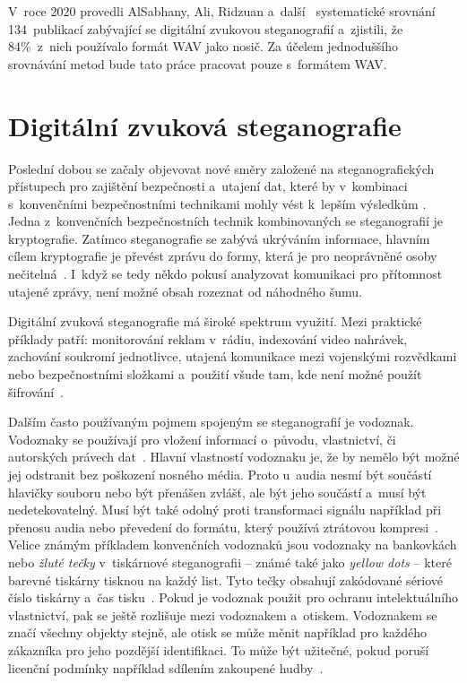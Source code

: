 V~roce 2020 provedli AlSabhany, Ali, Ridzuan a~další~\cite{AlSabhany2020}
systematické srovnání 134~publikací zabývající se digitální zvukovou
steganografií a~zjistili, že 84\%~z~nich používalo formát WAV jako nosič. Za
účelem jednoduššího srovnávání metod bude tato práce pracovat pouze s~formátem
WAV.

\section{Digitální zvuková steganografie}
\label{sec:digital-audio-steganography}

Poslední dobou se začaly objevovat nové směry založené na steganografických
přístupech pro zajištění bezpečnosti a~utajení dat, které by v~kombinaci
s~konvenčními bezpečnostními technikami mohly vést k~lepším výsledkům
\cite{Djebbar2012}. Jedna z~konvenčních bezpečnostních technik kombinovaných se
steganografií je kryptografie. Zatímco steganografie se zabývá ukrýváním
informace, hlavním cílem kryptografie je převést zprávu do formy, která je pro
neoprávněné osoby nečitelná~\cite{AlSabhany2020}. I~když se tedy někdo pokusí
analyzovat komunikaci pro přítomnost utajené zprávy, není možné obsah rozeznat
od náhodného šumu.

Digitální zvuková steganografie má široké spektrum využití. Mezi praktické
příklady patří: monitorování reklam v~rádiu, indexování video nahrávek,
zachování soukromí jednotlivce, utajená komunikace mezi vojenskými rozvědkami
nebo bezpečnostními složkami a~použití všude tam, kde není možné použít
šifrování~\cite{Dutta2020}.

Dalším často používaným pojmem spojeným se steganografií je vodoznak. Vodoznaky
se používají pro vložení informací o~původu, vlastnictví, či autorských právech
dat~\cite{Djebbar2012}\cite{Dutta2020}\cite{Swanson1998}. Hlavní vlastností
vodoznaku je, že by nemělo být možné jej odstranit bez poškození nosného média.
Proto u~audia nesmí být součástí hlavičky souboru nebo být přenášen zvlášť, ale
být jeho součástí a~musí být nedetekovatelný. Musí být také odolný proti
transformaci signálu například při přenosu audia nebo převedení do formátu,
který používá ztrátovou kompresi~\cite{Swanson1998}. Velice známým příkladem
konvenčních vodoznaků jsou vodoznaky na bankovkách nebo \textit{žluté tečky}
v~tiskárnové steganografii -- známé také jako \textit{yellow dots} -- které
barevné tiskárny tisknou na každý list. Tyto tečky obsahují zakódované sériové
číslo tiskárny a~čas tisku~\cite{Dutta2020}. Pokud je vodoznak použit pro
ochranu intelektuálního vlastnictví, pak se ještě rozlišuje mezi vodoznakem
a~otiskem. Vodoznakem se značí všechny objekty stejně, ale otisk se může měnit
například pro každého zákazníka pro jeho pozdější identifikaci. To může být
užitečné, pokud poruší licenční podmínky například sdílením zakoupené
hudby~\cite{Swanson1998}.

